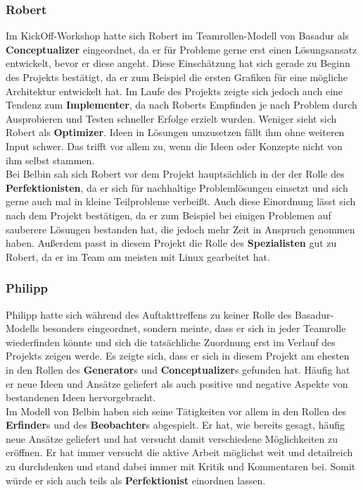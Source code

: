 \documentclass[a4paper,12pt,headsepline]{scrartcl}
\begin{document}
\subsubsection{Robert}
Im KickOff-Workshop hatte sich Robert im Teamrollen-Modell von Basadur als \textbf{Conceptualizer} eingeordnet, da er für Probleme gerne erst einen Lösungsansatz entwickelt, bevor er diese angeht. Diese Einschätzung hat sich gerade zu Beginn des Projekts bestätigt, da er zum Beispiel die ersten Grafiken für eine mögliche Architektur entwickelt hat. Im Laufe des Projekts zeigte sich jedoch auch eine Tendenz zum \textbf{Implementer}, da nach Roberts Empfinden je nach Problem durch Ausprobieren und Testen schneller Erfolge erzielt wurden. Weniger sieht sich Robert als \textbf{Optimizer}. Ideen in Lösungen umzusetzen fällt ihm ohne weiteren Input schwer. Das trifft vor allem zu, wenn die Ideen oder Konzepte nicht von ihm selbst stammen.\\
Bei Belbin sah sich Robert vor dem Projekt hauptsächlich in der der Rolle des \textbf{Perfektionisten}, da er sich für nachhaltige Problemlösungen einsetzt und sich gerne auch mal in kleine Teilprobleme verbeißt. Auch diese Einordnung lässt sich nach dem Projekt bestätigen, da er zum Beispiel bei einigen Problemen auf sauberere Lösungen bestanden hat, die jedoch mehr Zeit in Anspruch genommen haben. Außerdem passt in diesem Projekt die Rolle des \textbf{Spezialisten} gut zu Robert, da er im Team am meisten mit Linux gearbeitet hat.  
\subsubsection{Philipp}
Philipp hatte sich während des Auftakttreffens zu keiner Rolle des Basadur-Modells besonders eingeordnet, sondern meinte, dass er sich in jeder Teamrolle wiederfinden könnte und sich die tatsächliche Zuordnung erst im Verlauf des Projekts zeigen werde. Es zeigte sich, dass er sich in diesem Projekt am ehesten in den Rollen des \textbf{Generator}s und \textbf{Conceptualizer}s gefunden hat. Häufig hat er neue Ideen und Ansätze geliefert als auch positive und negative Aspekte von bestandenen Ideen hervorgebracht. \\
Im Modell von Belbin haben sich seine Tätigkeiten vor allem in den Rollen des \textbf{Erfinder}s und des \textbf{Beobachter}s abgespielt. Er hat, wie bereits gesagt, häufig neue Ansätze geliefert und hat versucht damit verschiedene Möglichkeiten zu eröffnen. Er hat immer versucht die aktive Arbeit möglichst weit und detailreich zu durchdenken und stand dabei immer mit Kritik und Kommentaren bei. Somit würde er sich auch teils als \textbf{Perfektionist} einordnen lassen.
\end{document}
